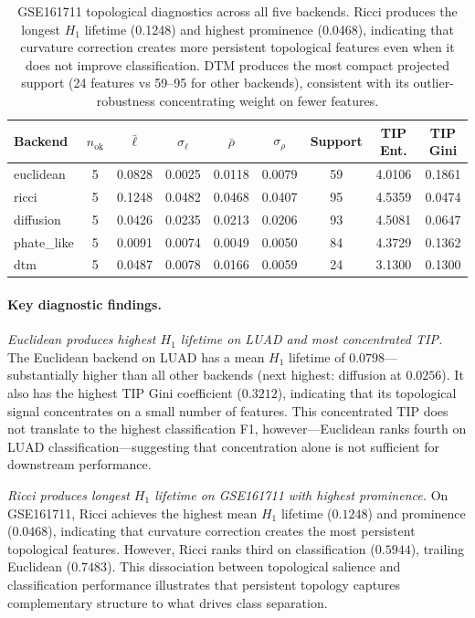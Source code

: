 \documentclass[11pt]{article}
\begin{document}
\begin{table}[h]
\centering
\small
\begin{tabular}{lcccccccc}
\toprule
Backend & $n_{\text{ok}}$ & $\bar{\ell}$ & $\sigma_\ell$ & $\bar{\rho}$ & $\sigma_\rho$ & Support & TIP Ent. & TIP Gini \\
\midrule
euclidean & 5 & 0.0828 & 0.0025 & 0.0118 & 0.0079 & 59 & 4.0106 & 0.1861 \\
ricci & 5 & 0.1248 & 0.0482 & 0.0468 & 0.0407 & 95 & 4.5359 & 0.0474 \\
diffusion & 5 & 0.0426 & 0.0235 & 0.0213 & 0.0206 & 93 & 4.5081 & 0.0647 \\
phate\_like & 5 & 0.0091 & 0.0074 & 0.0049 & 0.0050 & 84 & 4.3729 & 0.1362 \\
dtm & 5 & 0.0487 & 0.0078 & 0.0166 & 0.0059 & 24 & 3.1300 & 0.1300 \\
\bottomrule
\end{tabular}
\caption{GSE161711 topological diagnostics across all five backends.
Ricci produces the longest $H_1$ lifetime (0.1248) and highest prominence (0.0468), indicating that curvature correction creates more persistent topological features even when it does not improve classification.
DTM produces the most compact projected support (24 features vs 59--95 for other backends), consistent with its outlier-robustness concentrating weight on fewer features.}
\label{tab:diag_gse}
\end{table}

\paragraph{Key diagnostic findings.}

\textit{Euclidean produces highest $H_1$ lifetime on LUAD and most concentrated TIP.}
The Euclidean backend on LUAD has a mean $H_1$ lifetime of $0.0798$---substantially higher than all other backends (next highest: diffusion at $0.0256$).
It also has the highest TIP Gini coefficient ($0.3212$), indicating that its topological signal concentrates on a small number of features.
This concentrated TIP does not translate to the highest classification F1, however---Euclidean ranks fourth on LUAD classification---suggesting that concentration alone is not sufficient for downstream performance.

\textit{Ricci produces longest $H_1$ lifetime on GSE161711 with highest prominence.}
On GSE161711, Ricci achieves the highest mean $H_1$ lifetime ($0.1248$) and prominence ($0.0468$), indicating that curvature correction creates the most persistent topological features.
However, Ricci ranks third on classification ($0.5944$), trailing Euclidean ($0.7483$).
This dissociation between topological salience and classification performance illustrates that persistent topology captures complementary structure to what drives class separation.
\end{document}
